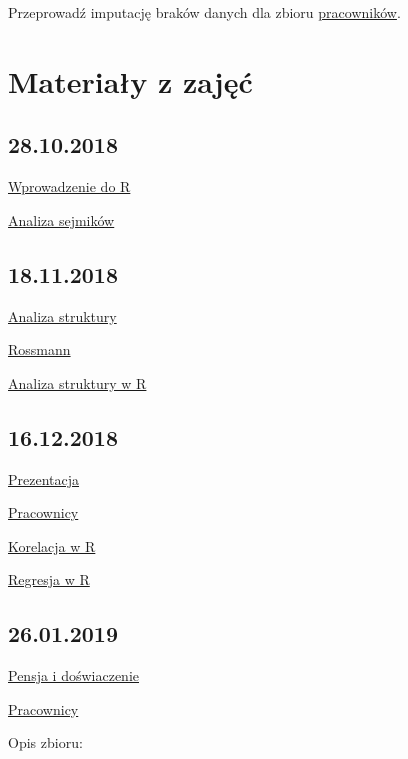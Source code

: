 \documentclass[]{book}
\begin{document}
Przeprowadź imputację braków danych dla zbioru
\href{data/pracownicy.RData}{pracowników}.

\chapter{Materiały z zajęć}\label{materiay-z-zajec}

\section{28.10.2018}\label{section}

\href{res/skrypt20181028.R}{Wprowadzenie do R}

\href{res/analiza20181028.R}{Analiza sejmików}

\section{18.11.2018}\label{section-1}

\href{https://departmentofstatisticspue.github.io/statystyka-opisowa/analiza-struktury.html}{Analiza
struktury}

\href{data/rossmann.xlsx}{Rossmann}

\href{res/zajecia20181118.R}{Analiza struktury w R}

\section{16.12.2018}\label{section-2}

\href{prezentacje/03.html}{Prezentacja}

\href{data/Salary_Data.csv}{Pracownicy}

\href{res/korelacje20181216.R}{Korelacja w R}

\href{res/regresja20181216.Rmd}{Regresja w R}

\section{26.01.2019}\label{section-3}

\href{data/salary.xlsx}{Pensja i doświaczenie}

\href{data/pracownicy.xlsx}{Pracownicy}

Opis zbioru:
\end{document}
